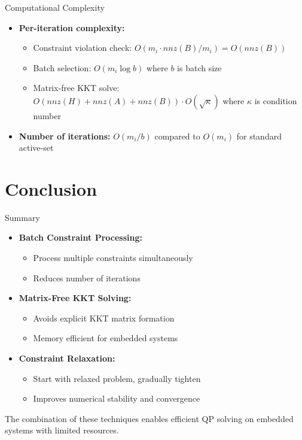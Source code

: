 \documentclass{beamer}
\begin{document}
\begin{frame}{Computational Complexity}
    \begin{itemize}
        \item \textbf{Per-iteration complexity:}
            \begin{itemize}
                \item Constraint violation check: $O(m_i \cdot nnz(B)/m_i) = O(nnz(B))$
                \item Batch selection: $O(m_i \log b)$ where $b$ is batch size
                \item Matrix-free KKT solve: $O(nnz(H) + nnz(A) + nnz(B)) \cdot O(\sqrt{\kappa})$
                  where $\kappa$ is condition number
            \end{itemize}
        \item \textbf{Number of iterations:} $O(m_i/b)$ compared to $O(m_i)$ for standard active-set
    \end{itemize}
\end{frame}

\section{Conclusion}

\begin{frame}{Summary}
    \begin{itemize}
        \item \textbf{Batch Constraint Processing:}
            \begin{itemize}
                \item Process multiple constraints simultaneously
                \item Reduces number of iterations
            \end{itemize}
        \item \textbf{Matrix-Free KKT Solving:}
            \begin{itemize}
                \item Avoids explicit KKT matrix formation
                \item Memory efficient for embedded systems
            \end{itemize}
        \item \textbf{Constraint Relaxation:}
            \begin{itemize}
                \item Start with relaxed problem, gradually tighten
                \item Improves numerical stability and convergence
            \end{itemize}
    \end{itemize}
    
    The combination of these techniques enables efficient QP solving on embedded systems with limited resources.
\end{frame}
\end{document}
